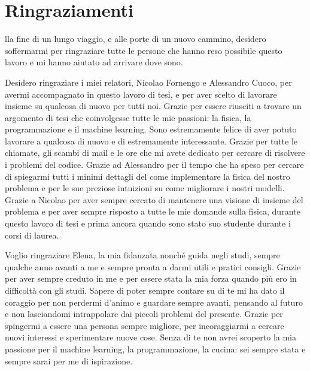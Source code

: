 \chapter*{Ringraziamenti}

lla fine di un lungo viaggio, e alle porte di un nuovo cammino, desidero soffermarmi per ringraziare tutte le persone che hanno reso possibile questo lavoro e mi hanno aiutato ad arrivare dove sono.

\vfill

Desidero ringraziare i miei relatori, Nicolao Fornengo e Alessandro Cuoco, per avermi accompagnato in questo lavoro di tesi, e per aver scelto di lavorare insieme su qualcosa di nuovo per tutti noi. Grazie per essere riusciti a trovare un argomento di tesi che coinvolgesse tutte le mie passioni: la fisica, la programmazione e il machine learning. Sono estremamente felice di aver potuto lavorare a qualcosa di nuovo e di estremamente interessante. Grazie per tutte le chiamate, gli scambi di mail e le ore che mi avete dedicato per cercare di risolvere i problemi del codice. Grazie ad Alessandro per il tempo che ha speso per cercare di spiegarmi tutti i minimi dettagli del come implementare la fisica del nostro problema e per le sue preziose intuizioni su come migliorare i nostri modelli. Grazie a Nicolao per aver sempre cercato di mantenere una visione di insieme del problema e per aver sempre risposto a tutte le mie domande sulla fisica, durante questo lavoro di tesi e prima ancora quando sono stato suo studente durante i corsi di laurea.

Voglio ringraziare Elena, la mia fidanzata nonché guida negli studi, sempre qualche anno avanti a me e sempre pronta a darmi utili e pratici consigli. Grazie per aver sempre creduto in me e per essere stata la mia forza quando più ero in difficoltà con gli studi. Sapere di poter sempre contare su di te mi ha dato il coraggio per non perdermi d'animo e guardare sempre avanti, pensando al futuro e non lasciandomi intrappolare dai piccoli problemi del presente. Grazie per spingermi a essere una persona sempre migliore, per incoraggiarmi a cercare nuovi interessi e sperimentare nuove cose. Senza di te non avrei scoperto la mia passione per il machine learning, la programmazione, la cucina: sei sempre stata e sempre sarai per me di ispirazione.


